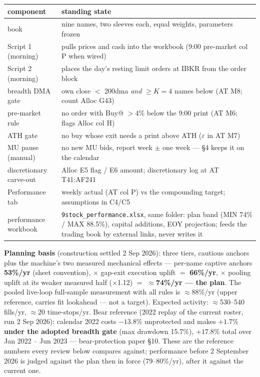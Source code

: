 \documentclass[11pt,a4paper]{article}
\begin{document}
\begin{center}
\begin{tabular}{ll}
\toprule
component & standing state \\
\midrule
book & nine names, two sleeves each, equal weights, parameters frozen \\
Script 1 (morning) & pulls prices and cash into the workbook (9:00 pre-market col P when wired) \\
Script 2 (morning) & places the day's resting limit orders at IBKR from the order block \\
breadth DMA gate & own close $<$ 200dma \emph{and} $\ge K{=}4$ names below (AT M8; count Alloc G43) \\
pre-market rule & no order with Buy@ $>4\%$ below the 9:00 print (AT M6; flags Alloc col H) \\
ATH gate & no buy whose exit needs a print above ATH ($\varepsilon$ in AT M7) \\
MU pause (manual) & no new MU bids, report week $\pm$ one week --- \S4 keeps it on the calendar \\
discretionary carve-out & Alloc E5 flag / E6 amount; discretionary log at AT T41:AF241 \\
Performance tab & weekly actual (AT col P) vs the compounding target; assumptions in C4/C5 \\
performance workbook & \texttt{9stock\_performance.xlsx}, same folder: plan band (MIN 74\% / MAX 88.5\%), capital additions, EOY projection; feeds the trading book by external links, never writes it \\
\bottomrule
\end{tabular}
\end{center}

\textbf{Planning basis} (construction settled 2 Sep 2026): three tiers,
cautious anchors plus the machine's two measured mechanical effects ---
per-name captive anchors \textbf{53\%/yr} (sheet convention), $\times$
gap-exit execution uplift $=$ \textbf{66\%/yr}, $\times$ pooling uplift at
its weaker measured half ($\times$1.12) $=$ \textbf{$\approx$74\%/yr --- the
plan}. The pooled live-loop full-sample measurement with all rules is
$\approx$88\%/yr (upper reference, carries fit lookahead --- not a target).
Expected activity: $\approx$530--540 fills/yr, $\approx$20 time-stops/yr.
Bear reference (2022 replay of the current roster, run 2 Sep 2026): calendar
2022 costs $-13.8\%$ unprotected and makes \textbf{$+1.7\%$ under the adopted
breadth gate} (max drawdown 15.7\%), $+17.8\%$ total over Jan 2022 -- Jun
2023 --- bear-protection paper \S10.
These are the reference numbers every review below compares against;
performance before 2 September 2026 is judged against the plan then in
force (79--80\%/yr), after it against the current one.
\end{document}

